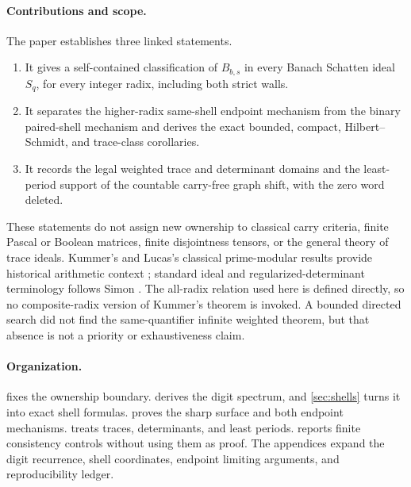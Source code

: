 \paragraph{Contributions and scope.}
The paper establishes three linked statements.
\begin{enumerate}
  \item It gives a self-contained classification of \(B_{b,s}\) in every
  Banach Schatten ideal \(S_q\), for every integer radix, including both
  strict walls.
  \item It separates the higher-radix same-shell endpoint mechanism from the
  binary paired-shell mechanism and derives the exact bounded, compact,
  Hilbert--Schmidt, and trace-class corollaries.
  \item It records the legal weighted trace and determinant domains and the
  least-period support of the countable carry-free graph shift, with the
  zero word deleted.
\end{enumerate}

These statements do not assign new ownership to classical carry criteria,
finite Pascal or Boolean matrices, finite disjointness tensors, or the
general theory of trace ideals.  Kummer's and Lucas's classical
prime-modular results provide historical arithmetic context
\cite{kummer1852ergaenzung,lucas1878congruences}; standard ideal and
regularized-determinant terminology follows Simon \cite{simon2005trace}.
The all-radix relation used here is defined directly, so no
composite-radix version of Kummer's theorem is invoked.  A bounded directed
search did not find the same-quantifier infinite weighted theorem, but that
absence is not a priority or exhaustiveness claim.

\paragraph{Organization.}
 fixes the ownership boundary.
 derives the digit spectrum, and \cref{sec:shells} turns it
into exact shell formulas.   proves the sharp surface
and both endpoint mechanisms.   treats traces,
determinants, and least periods.   reports finite
consistency controls without using them as proof.  The appendices expand
the digit recurrence, shell coordinates, endpoint limiting arguments, and
reproducibility ledger.
